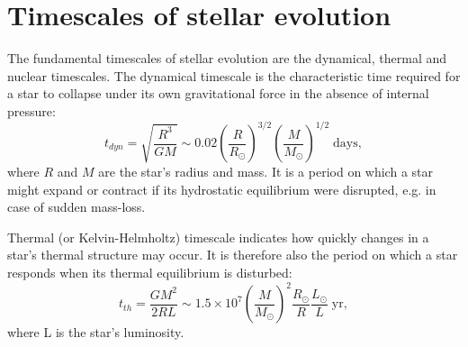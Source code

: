 \section{Timescales of stellar evolution}\label{sec:timescales}

The fundamental timescales of stellar evolution are the dynamical, thermal and nuclear timescales. The dynamical timescale is the characteristic time required for a star to collapse under its own gravitational force in the absence of internal pressure:
\begin{equation}\label{eq:dynamical_timsecale}
    t_{dyn} = \sqrt{\frac{R^3}{GM}} \sim 0.02 \left( \frac{R}{R_{\odot}} \right)^{3/2} \left( \frac{M}{M_{\odot}}\right)^{1/2} \; \text{days},
\end{equation}
where $R$ and $M$ are the star's radius and mass. It is a period on which a star might expand or contract if its hydrostatic equilibrium were disrupted, e.g. in case of sudden mass-loss.

Thermal (or Kelvin-Helmholtz) timescale indicates how quickly changes in a star's thermal structure may occur. It is therefore also the period on which a star responds when its thermal equilibrium is disturbed:
\begin{equation}\label{eq:thermal_timsecale}
    t_{th} = \frac{G M^2}{2RL} \sim 1.5 \times 10^7 \left( \frac{M}{M_{\odot}} \right)^{2} \frac{R_{\odot}}{R} \frac{L_{\odot}}{L} \; \text{yr},
\end{equation}
where L is the star's luminosity.

